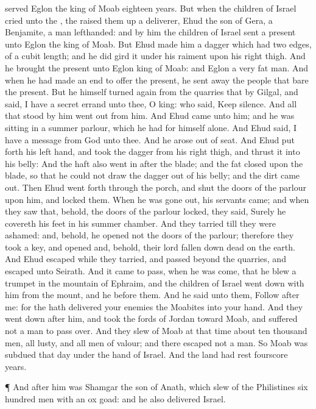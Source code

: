{served
Eglon the
king of
Moab
eighteen
years.
But when the
children of
Israel
cried unto the
{}, the
{} raised them
up a
deliverer,
Ehud the
son of
Gera, a
Benjamite, a
man
lefthanded: and by
him the
children of
Israel
sent a
present unto
Eglon the
king of
Moab.
But
Ehud
made him a
dagger which had
two
edges, of a
cubit
length; and he did
gird it under his
raiment upon his
right
thigh.
And he
brought the
present unto
Eglon
king of
Moab: and
Eglon
{} a
very
fat
man.
And when he had made an
end to
offer the
present, he sent
away the
people that
bare the
present.
But he himself turned
again from the
quarries that
{} by
Gilgal, and
said, I have a
secret
errand unto thee, O
king: who
said, Keep
silence. And all that
stood by him went
out from him.
And
Ehud
came unto him; and he was
sitting in a
summer
parlour, which he had for himself alone. And
Ehud
said, I have a
message from
God unto thee. And he
arose out of
{}
seat.
And
Ehud put
forth his
left
hand, and
took the
dagger from his
right
thigh, and
thrust it into his
belly:
And the
haft also went
in
after the
blade; and the
fat
closed
upon the
blade, so that he could not
draw the
dagger out of his
belly; and the
dirt came
out.
Then
Ehud went
forth through the
porch, and
shut the
doors of the
parlour upon him, and
locked them.
When he was gone
out, his
servants
came; and when they
saw that, behold, the
doors of the
parlour
{}
locked, they
said, Surely he
covereth his
feet in his
summer
chamber.
And they
tarried till they were
ashamed: and, behold, he
opened not the
doors of the
parlour; therefore they
took a
key, and
opened
{} and, behold, their
lord
{} fallen
down
dead on the
earth.
And
Ehud
escaped while they
tarried, and passed
beyond the
quarries, and
escaped unto
Seirath.
And it came to pass, when he was
come, that he
blew a
trumpet in the
mountain of
Ephraim, and the
children of
Israel went
down with him from the
mount, and he
before them.
And he
said unto them,
Follow
after me: for the
{} hath
delivered your
enemies the
Moabites into your
hand. And they went
down
after him, and
took the
fords of
Jordan toward
Moab, and
suffered not a
man to pass
over.
And they
slew of
Moab at that
time about
ten
thousand
men, all
lusty, and all
men of
valour; and there
escaped not a
man.
So
Moab was
subdued that
day under the
hand of
Israel. And the
land had
rest
fourscore
years.
\par }{\PP {}¶ And
after him was
Shamgar the
son of
Anath, which
slew of the
Philistines
six
hundred
men with an
ox
goad: and he also
delivered
Israel.

}
